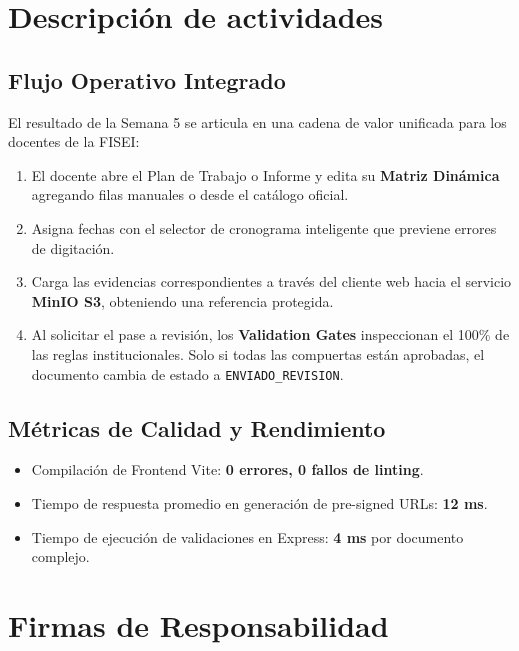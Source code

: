 \documentclass[12pt,a4paper]{article}
\begin{document}
\section{Descripción de actividades}

\subsection{Flujo Operativo Integrado}
El resultado de la Semana 5 se articula en una cadena de valor unificada para los docentes de la FISEI:
\begin{enumerate}[leftmargin=1.5em, itemsep=2pt]
    \item El docente abre el Plan de Trabajo o Informe y edita su \textbf{Matriz Dinámica} agregando filas manuales o desde el catálogo oficial.
    \item Asigna fechas con el selector de cronograma inteligente que previene errores de digitación.
    \item Carga las evidencias correspondientes a través del cliente web hacia el servicio \textbf{MinIO S3}, obteniendo una referencia protegida.
    \item Al solicitar el pase a revisión, los \textbf{Validation Gates} inspeccionan el 100\% de las reglas institucionales. Solo si todas las compuertas están aprobadas, el documento cambia de estado a \texttt{ENVIADO\_REVISION}.
\end{enumerate}

\subsection{Métricas de Calidad y Rendimiento}
\begin{itemize}[leftmargin=1.5em, itemsep=1.5pt]
    \item Compilación de Frontend Vite: \textbf{0 errores, 0 fallos de linting}.
    \item Tiempo de respuesta promedio en generación de pre-signed URLs: \textbf{12 ms}.
    \item Tiempo de ejecución de validaciones en Express: \textbf{4 ms} por documento complejo.
\end{itemize}

\section{Firmas de Responsabilidad}
\end{document}
